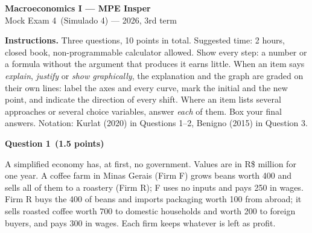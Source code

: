 \documentclass[11pt,a4paper]{article}
\newif\ifsolucoes
\newcommand{\disciplina}{Macroeconomics I --- MPE Insper}
\newcommand{\listatema}{Mock Exam 4}
\newcommand{\questao}[3]{\Needspace{12\baselineskip}\bigskip\noindent
  {\large\bfseries\color{blue!55!black}Question #1}\ \textbf{(#2 points)}\par\smallskip\noindent #3\par}
\begin{document}
\begin{center}
  {\Large\bfseries \disciplina}\\[2pt]
  {\large \listatema\ (Simulado 4) --- 2026, 3rd term}\ifsolucoes\\[2pt]\textit{Solutions and Grading Rubric}\fi
\end{center}
\vspace{2pt}

{\footnotesize\noindent\textbf{Instructions.} Three questions, 10 points in total. Suggested time:
2 hours, closed book, non-programmable calculator allowed. Show every step: a number or a formula
without the argument that produces it earns little. When an item says \emph{explain},
\emph{justify} or \emph{show graphically}, the explanation and the graph are graded on their own
lines: label the axes and every curve, mark the initial and the new point, and indicate the
direction of every shift. Where an item lists several approaches or several choice variables,
answer \emph{each} of them. Box your final answers. Notation: Kurlat (2020) in Questions 1--2,
Benigno (2015) in Question 3.\par}

\renewcommand{\theequation}{G\arabic{equation}}%
\questao{1}{1.5}{A simplified economy has, at first, no government. Values are in R\$ million
for one year. A coffee farm in Minas Gerais (Firm F) grows beans worth 400 and sells all of them
to a roastery (Firm R); F uses no inputs and pays 250 in wages. Firm R buys the 400 of beans and
imports packaging worth 100 from abroad; it sells roasted coffee worth 700 to domestic households
and worth 200 to foreign buyers, and pays 300 in wages. Each firm keeps whatever is left as profit.}
\end{document}

